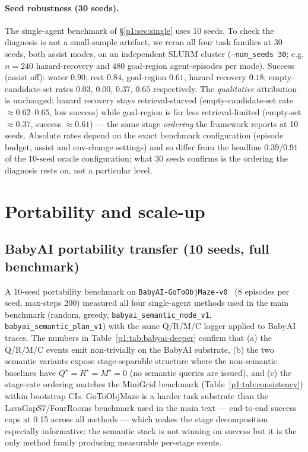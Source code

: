 \documentclass{article}
\newcommand{\method}[1]{\texttt{#1}}
\begin{document}
\paragraph{Seed robustness (30 seeds).}
The single-agent benchmark of \S\ref{p1:sec:single} uses 10 seeds. To check the
diagnosis is not a small-sample artefact, we reran all four task families at
30 seeds, both assist modes, on an independent SLURM cluster
(\method{--num\_seeds 30}; e.g. $n{=}240$ hazard-recovery and $480$
goal-region agent-episodes per mode). Success (assist off): water $0.90$, rest
$0.84$, goal-region $0.61$, hazard recovery $0.18$; empty-candidate-set rates
$0.03$, $0.00$, $0.37$, $0.65$ respectively. The \emph{qualitative} attribution is
unchanged: hazard recovery stays retrieval-starved (empty-candidate-set rate
$\approx0.62$--$0.65$, low success) while goal-region is far less
retrieval-limited (empty-set $\approx0.37$, success $\approx0.61$) --- the same
stage \emph{ordering} the framework reports at 10 seeds. Absolute rates depend
on the exact benchmark configuration (episode budget, assist and env-change
settings) and so differ from the headline $0.39$/$0.91$ of the 10-seed oracle
configuration; what 30 seeds confirms is the ordering the diagnosis rests on,
not a particular level.

\section{Portability and scale-up}
\label{p1:app:babyai}

\subsection{BabyAI portability transfer (10 seeds, full benchmark)}
\label{p1:app:babyai-deeper}

A 10-seed portability benchmark on \texttt{BabyAI-GoToObjMaze-v0}~\citep{chevalier2018babyai} (8 episodes per seed, max-steps 200) measured all four single-agent methods used in the main benchmark (random, greedy, \texttt{babyai\_semantic\_node\_v1}, \texttt{babyai\_semantic\_plan\_v1}) with the same Q/R/M/C logger applied to BabyAI traces. The numbers in Table~\ref{p1:tab:babyai-deeper} confirm that (a) the Q/R/M/C events emit non-trivially on the BabyAI substrate, (b) the two semantic variants expose stage-separable structure where the non-semantic baselines have $Q^\star{=}R^\star{=}M^\star{=}0$ (no semantic queries are issued), and (c) the stage-rate ordering matches the MiniGrid benchmark (Table~\ref{p1:tab:consistency}) within bootstrap CIs. GoToObjMaze is a harder task substrate than the LavaGapS7/FourRooms benchmark used in the main text --- end-to-end success caps at 0.15 across all methods --- which makes the stage decomposition especially informative: the semantic stack is not winning on success but it is the only method family producing measurable per-stage events.
\end{document}
